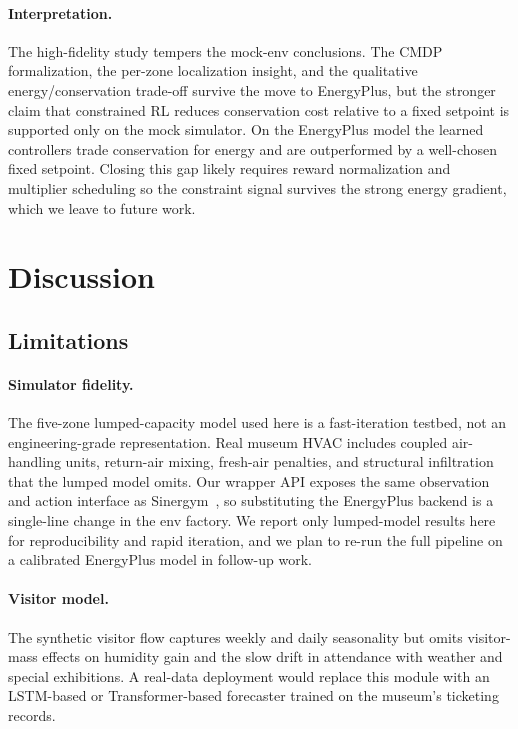 \paragraph{Interpretation.}
The high-fidelity study tempers the mock-env conclusions. The CMDP
formalization, the per-zone localization insight, and the qualitative
energy/conservation trade-off survive the move to EnergyPlus, but the
stronger claim that constrained RL reduces conservation cost relative
to a fixed setpoint is supported only on the mock simulator. On the
EnergyPlus model the learned controllers trade conservation for energy
and are outperformed by a well-chosen fixed setpoint. Closing this gap
likely requires reward normalization and multiplier scheduling so the
constraint signal survives the strong energy gradient, which we leave
to future work.

\section{Discussion}\label{sec:discussion}

\subsection{Limitations}

\paragraph{Simulator fidelity.}
The five-zone lumped-capacity model used here is a fast-iteration
testbed, not an engineering-grade representation. Real museum HVAC
includes coupled air-handling units, return-air mixing, fresh-air
penalties, and structural infiltration that the lumped model omits.
Our wrapper API exposes the same observation and action interface as
Sinergym~\citep{manjavacas2024sinergym}, so substituting the
EnergyPlus backend is a single-line change in the env factory. We
report only lumped-model results here for reproducibility and rapid
iteration, and we plan to re-run the full pipeline on a calibrated
EnergyPlus model in follow-up work.

\paragraph{Visitor model.}
The synthetic visitor flow captures weekly and daily seasonality but
omits visitor-mass effects on humidity gain and the slow drift in
attendance with weather and special exhibitions. A real-data
deployment would replace this module with an LSTM-based or
Transformer-based forecaster trained on the museum's ticketing
records.

